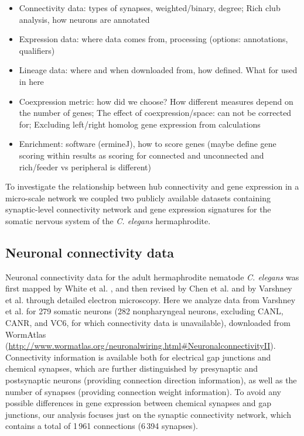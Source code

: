 \documentclass[10pt,letterpaper]{article}
\begin{document}
\begin{itemize}
    \item{Connectivity data: types of synapses, weighted/binary, degree; Rich club analysis, how neurons are annotated}
    \item{Expression data: where data comes from, processing (options: annotations, qualifiers)}
    \item{Lineage data: where and when downloaded from, how defined. What for used in here}
    \item{Coexpression metric: how did we choose? How different measures depend on the number of genes; The effect of coexpression/space: can not be corrected for; Excluding left/right homolog gene expression from calculations}
    \item{Enrichment: software (ermineJ), how to score genes (maybe define gene scoring within results as scoring for connected and unconnected and rich/feeder vs peripheral is different)}
\end{itemize}

To investigate the relationship between hub connectivity and gene expression in a micro-scale network we coupled two publicly available datasets containing synaptic-level connectivity network and gene expression signatures for the somatic nervous system of the \textit{C. elegans} hermaphrodite.

\subsection*{Neuronal connectivity data}

Neuronal connectivity data for the adult hermaphrodite nematode \emph{C. elegans} was first mapped by White et al. \cite{White:1986tx}, and then revised by Chen et al. \cite{Chen:2006ie} and by Varshney et al. \citet{Varshney2011} through detailed electron microscopy.
Here we analyze data from Varshney et al. \cite{Varshney2011} for 279 somatic neurons (282 nonpharyngeal neurons, excluding CANL, CANR, and VC6, for which connectivity data is unavailable), downloaded from WormAtlas (\url{http://www.wormatlas.org/neuronalwiring.html#NeuronalconnectivityII}).
Connectivity information is available both for electrical gap junctions and chemical synapses, which are further distinguished by presynaptic and postsynaptic neurons (providing connection direction information), as well as the number of synapses (providing connection weight information).
To avoid any possible differences in gene expression between chemical synapses and gap junctions, our analysis focuses just on the synaptic connectivity network, which contains a total of 1\,961 connections (6\,394 synapses).
\end{document}
